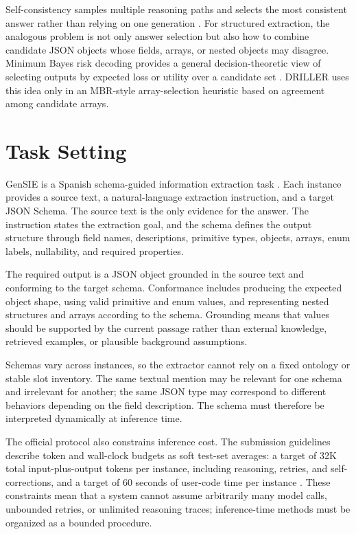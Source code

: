 Self-consistency samples multiple reasoning paths and selects the most consistent answer rather than relying on one generation \cite{wang2022selfconsistency}. For structured extraction, the analogous problem is not only answer selection but also how to combine candidate JSON objects whose fields, arrays, or nested objects may disagree. Minimum Bayes risk decoding provides a general decision-theoretic view of selecting outputs by expected loss or utility over a candidate set \cite{kumar-byrne-2004-minimum}. DRILLER uses this idea only in an MBR-style array-selection heuristic based on agreement among candidate arrays.

\section{Task Setting}

GenSIE is a Spanish schema-guided information extraction task \cite{gensie2026overview}. Each instance provides a source text, a natural-language extraction instruction, and a target JSON Schema. The source text is the only evidence for the answer. The instruction states the extraction goal, and the schema defines the output structure through field names, descriptions, primitive types, objects, arrays, enum labels, nullability, and required properties.

The required output is a JSON object grounded in the source text and conforming to the target schema. Conformance includes producing the expected object shape, using valid primitive and enum values, and representing nested structures and arrays according to the schema. Grounding means that values should be supported by the current passage rather than external knowledge, retrieved examples, or plausible background assumptions.

Schemas vary across instances, so the extractor cannot rely on a fixed ontology or stable slot inventory. The same textual mention may be relevant for one schema and irrelevant for another; the same JSON type may correspond to different behaviors depending on the field description. The schema must therefore be interpreted dynamically at inference time.

The official protocol also constrains inference cost. The submission guidelines describe token and wall-clock budgets as soft test-set averages: a target of 32K total input-plus-output tokens per instance, including reasoning, retries, and self-corrections, and a target of 60 seconds of user-code time per instance \cite{gensie2026submission}. These constraints mean that a system cannot assume arbitrarily many model calls, unbounded retries, or unlimited reasoning traces; inference-time methods must be organized as a bounded procedure.

